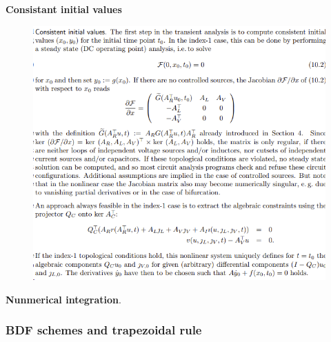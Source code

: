 \documentclass[11pt,titlepage]{article}
\begin{document}
				\textbf{Consistant initial values} 
				\begin{figure}[H]
					\centering
					\includegraphics[width=0.7\linewidth]{screenshot009}
					\caption{}
					\label{fig:screenshot009}
				\end{figure}
				
				\textbf{Nunmerical integration}.
				
				
			\subsubsection{BDF schemes and trapezoidal rule}
				
			
			
			
	
\end{document}
